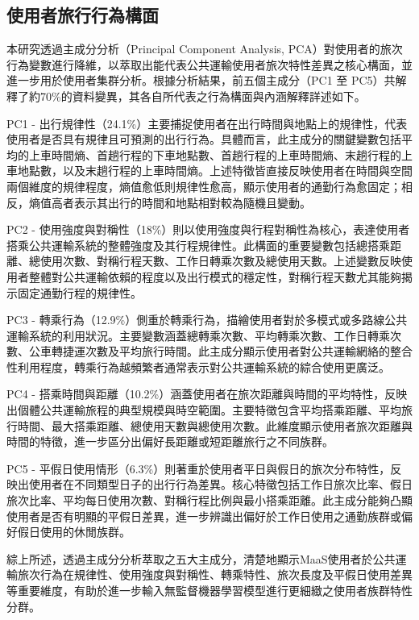 \subsection{使用者旅行行為構面}\label{ux4f7fux7528ux8005ux65c5ux884cux884cux70baux69cbux9762}

本研究透過主成分分析（Principal Component Analysis,
PCA）對使用者的旅次行為變數進行降維，以萃取出能代表公共運輸使用者旅次特性差異之核心構面，並進一步用於使用者集群分析。根據分析結果，前五個主成分（PC1
至
PC5）共解釋了約70\%的資料變異，其各自所代表之行為構面與內涵解釋詳述如下。

PC1 -
出行規律性（24.1\%）主要捕捉使用者在出行時間與地點上的規律性，代表使用者是否具有規律且可預測的出行行為。具體而言，此主成分的關鍵變數包括平均的上車時間熵、首趟行程的下車地點數、首趟行程的上車時間熵、末趟行程的上車地點數，以及末趟行程的上車時間熵。上述特徵皆直接反映使用者在時間與空間兩個維度的規律程度，熵值愈低則規律性愈高，顯示使用者的通勤行為愈固定；相反，熵值高者表示其出行的時間和地點相對較為隨機且變動。

PC2 -
使用強度與對稱性（18\%）則以使用強度與行程對稱性為核心，表達使用者搭乘公共運輸系統的整體強度及其行程規律性。此構面的重要變數包括總搭乘距離、總使用次數、對稱行程天數、工作日轉乘次數及總使用天數。上述變數反映使用者整體對公共運輸依賴的程度以及出行模式的穩定性，對稱行程天數尤其能夠揭示固定通勤行程的規律性。

PC3 -
轉乘行為（12.9\%）側重於轉乘行為，描繪使用者對於多模式或多路線公共運輸系統的利用狀況。主要變數涵蓋總轉乘次數、平均轉乘次數、工作日轉乘次數、公車轉捷運次數及平均旅行時間。此主成分顯示使用者對公共運輸網絡的整合性利用程度，轉乘行為越頻繁者通常表示對公共運輸系統的綜合使用更廣泛。

PC4 -
搭乘時間與距離（10.2\%）涵蓋使用者在旅次距離與時間的平均特性，反映出個體公共運輸旅程的典型規模與時空範圍。主要特徵包含平均搭乘距離、平均旅行時間、最大搭乘距離、總使用天數與總使用次數。此維度顯示使用者旅次距離與時間的特徵，進一步區分出偏好長距離或短距離旅行之不同族群。

PC5 -
平假日使用情形（6.3\%）則著重於使用者平日與假日的旅次分布特性，反映出使用者在不同類型日子的出行行為差異。核心特徵包括工作日旅次比率、假日旅次比率、平均每日使用次數、對稱行程比例與最小搭乘距離。此主成分能夠凸顯使用者是否有明顯的平假日差異，進一步辨識出偏好於工作日使用之通勤族群或偏好假日使用的休閒族群。

綜上所述，透過主成分分析萃取之五大主成分，清楚地顯示MaaS使用者於公共運輸旅次行為在規律性、使用強度與對稱性、轉乘特性、旅次長度及平假日使用差異等重要維度，有助於進一步輸入無監督機器學習模型進行更細緻之使用者族群特性分群。

